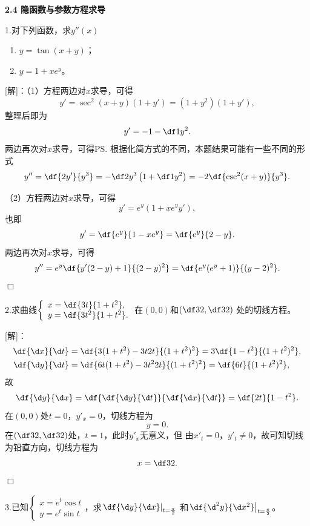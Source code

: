 \begin{center}
	\bf 2.4 隐函数与参数方程求导
\end{center}

\bigskip

1.对下列函数，求$y''(x)$
  \begin{enumerate}[(1)]
    \setlength{\itemindent}{1cm}
    \item $y=\tan(x+y)$；
    \item $y=1+xe^y$。
  \end{enumerate}

[解]：（1）方程两边对$x$求导，可得
$$y'=\sec^2(x+y)(1+y')=(1+y^2)(1+y'),$$
整理后即为
$$y'=-1-\df1{y^2}.$$
两边再次对$x$求导，可得\ps{根据化简方式的不同，本题结果可能有一些不同的形式}
$$y''=\df{2y'}{y^3}=-\df2{y^3}\left(1+\df1{y^2}\right)
=-2\df{\csc^2(x+y)}{y^3}.$$

（2）方程两边对$x$求导，可得
$$y'=e^y(1+xe^yy'),$$
也即
$$y'=\df{e^y}{1-xe^y}=\df{e^y}{2-y}.$$
两边再次对$x$求导，可得
$$y''=e^y\df{y'(2-y)+1}{(2-y)^2}=\df{e^y(e^y+1)}{(y-2)^2}.$$
\hfill$\Box$

\bigskip

2.求曲线$\left\{\begin{array}{l}
x=\df{3t}{1+t^2},\\ y=\df{3t^2}{1+t^2}.
\end{array}\right.$在$(0,0)$和$\left(\df32,\df32\right)$
处的切线方程。

[解]：
\begin{align*}
	\df{\d x}{\d t}&=\df{3(1+t^2)-3t2t}{(1+t^2)^2}=3\df{1-t^2}{(1+t^2)^2},\\
	\df{\d y}{\d t}&=\df{6t(1+t^2)-3t^22t}{(1+t^2)^2}
	=\df{6t}{(1+t^2)^2},
\end{align*}
故
$$\df{\d y}{\d x}=\df{\df{\d y}{\d t}}{\df{\d x}{\d t}}
=\df{2t}{1-t^2}.$$
在$(0,0)$处$t=0$，$y'_x=0$，切线方程为
$$y=0.$$
在$\left(\df32,\df32\right)$处，$t=1$，此时$y'_x$无意义，但
由$x'_t=0$，$y'_t\ne 0$，故可知切线为铅直方向，切线方程为
$$x=\df32.$$
\hfill$\Box$

\bigskip

3.已知$\left\{\begin{array}{l}
  	x=e^t\cos t\\ y=e^t\sin t
\end{array}\right.$，求$\left.\df{\d y}{\d x}\right|_{t=\frac{\pi}2}$
和$\left.\df{\d^2 y}{\d x^2}\right|_{t=\frac{\pi}2}$。

